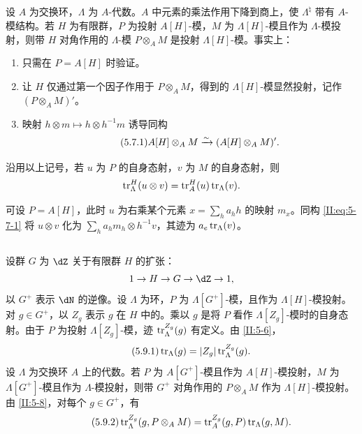 \subsection{}\label{II:5-7}
设 $A$ 为交换环，$\Lambda$ 为 $A$-代数。$A$ 中元素的乘法作用下降到商上，使 $\Lambda^\natural$ 带有 $A$-模结构。若 $H$ 为有限群，$P$ 为投射 $A[H]$-模，$M$ 为 $\Lambda[H]$-模且作为 $\Lambda$-模投射，则带 $H$ 对角作用的 $\Lambda$-模 $P\otimes_A M$ 是投射 $\Lambda[H]$-模。事实上：
\begin{enumerate}[\indent a)]
\item 只需在 $P=A[H]$ 时验证。
\item 让 $H$ 仅通过第一个因子作用于 $P\otimes_A M$，得到的 $\Lambda[H]$-模显然投射，记作 $(P\otimes_A M)'$。
\item 映射 $h\otimes m\mapsto h\otimes h^{-1}m$ 诱导同构
\begin{equation*}\tag{5.7.1}\label{II:eq:5-7-1}
A[H]\otimes_A M\xrightarrow\sim(A[H]\otimes_A M)'.
\end{equation*}
\end{enumerate}
\begin{proposition_}\label{II:5-8}
沿用以上记号，若 $u$ 为 $P$ 的自身态射，$v$ 为 $M$ 的自身态射，则
\[\operatorname{tr}_\Lambda^H(u\otimes v)=\operatorname{tr}_A^H(u)\operatorname{tr}_\Lambda(v).\]
\end{proposition_}
可设 $P=A[H]$，此时 $u$ 为右乘某个元素 $x=\sum_ha_hh$ 的映射 $m_x$。同构 \eqref{II:eq:5-7-1} 将 $u\otimes v$ 化为 $\sum_ha_hm_h\otimes h^{-1}v$，其迹为 $a_e\operatorname{tr}_\Lambda(v)$。

\subsection{}\label{II:5-9}
设群 $G$ 为 $\dZ$ 关于有限群 $H$ 的扩张：
\[1\to H\to G\to\dZ\to1,\]
以 $G^+$ 表示 $\dN$ 的逆像。设 $\Lambda$ 为环，$P$ 为 $\Lambda[G^+]$-模，且作为 $\Lambda[H]$-模投射。对 $g\in G^+$，以 $Z_g$ 表示 $g$ 在 $H$ 中的。乘以 $g$ 是将 $P$ 看作 $\Lambda[Z_g]$-模时的自身态射。由于 $P$ 为投射 $\Lambda[Z_g]$-模，迹 $\operatorname{tr}_\Lambda^{Z_g}(g)$ 有定义。由 \ref{II:5-6}，
\begin{equation*}\tag{5.9.1}\label{II:eq:5-9-1}
\operatorname{tr}_\Lambda(g)=|Z_g|\operatorname{tr}_\Lambda^{Z_g}(g).
\end{equation*}
设 $\Lambda$ 为交换环 $A$ 上的代数。若 $P$ 为 $A[G^+]$-模且作为 $A[H]$-模投射，$M$ 为 $\Lambda[G^+]$-模且作为 $\Lambda$-模投射，则带 $G^+$ 对角作用的 $P\otimes_A M$ 作为 $\Lambda[H]$-模投射。由 \ref{II:5-8}，对每个 $g\in G^+$，有
\begin{equation*}\tag{5.9.2}\label{II:eq:5-9-2}
\operatorname{tr}_\Lambda^{Z_g}(g,P\otimes_A M)=\operatorname{tr}_A^{Z_g}(g,P)\operatorname{tr}_\Lambda(g,M).
\end{equation*}

